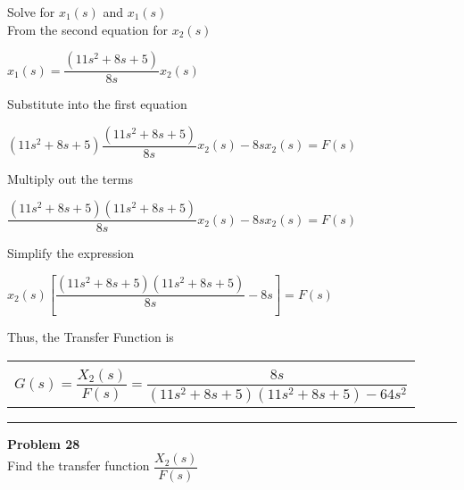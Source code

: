\documentclass[11pt,letterpaper]{article}
\begin{document}
Solve for $x_1(s)$ and $x_1(s)$\\[12pt]
From the second equation for $x_2(s)$\\
\begin{center}
	$x_1(s)=\dfrac{(11s^2+8s+5)}{8s}x_2(s)$\\
\end{center}
Substitute into the first equation\\
\begin{center}
	$(11s^2+8s+5)\dfrac{(11s^2+8s+5)}{8s}x_2(s)-8sx_2(s)=F(s)$\\
\end{center}
Multiply out the terms\\
\begin{center}
	$\dfrac{(11s^2+8s+5)(11s^2+8s+5)}{8s}x_2(s)-8sx_2(s)=F(s)$\\
\end{center}
Simplify the expression\\
\begin{center}
	$x_2(s)\left[\dfrac{(11s^2+8s+5)(11s^2+8s+5)}{8s}-8s\right]=F(s) $\\
\end{center}
Thus, the Transfer Function is\\
\begin{center}
	\begin{tabular}{|c|}
		\hline \\
		$G(s)=\dfrac{X_2(s)}{F(s)}=\dfrac{8s}{(11s^2+8s+5)(11s^2+8s+5)-64s^2}$	\\ [12pt]
	\hline
	\end{tabular}	
\end{center}

\clearpage

\rule{\textwidth}{1pt}
\textbf{Problem 28}\\
Find the transfer function $\dfrac{X_2(s)}{F(s)}$\\
\end{document}
